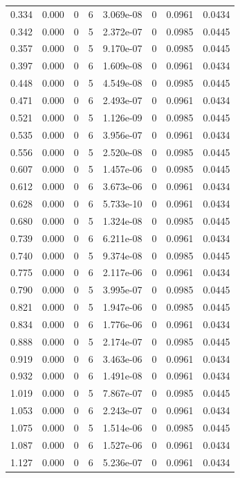 \documentclass[preview]{standalone}
\begin{document}
{{\begin{tabular}{L{1.2cm}C{1.2cm} C{0.3cm}C{0.5cm} C{1.4cm}C{1.4cm} C{1.4cm}C{1.4cm}}
  0.334  &  0.000  & 0     &  6 &  3.069e-08  & 0  & 0.0961 &  0.0434   \\ 
  0.342  &  0.000  & 0     &  5 &  2.372e-07  & 0  & 0.0985 &  0.0445   \\ 
  0.357  &  0.000  & 0     &  5 &  9.170e-07  & 0  & 0.0985 &  0.0445   \\ 
  0.397  &  0.000  & 0     &  6 &  1.609e-08  & 0  & 0.0961 &  0.0434   \\ 
  0.448  &  0.000  & 0     &  5 &  4.549e-08  & 0  & 0.0985 &  0.0445   \\ 
  0.471  &  0.000  & 0     &  6 &  2.493e-07  & 0  & 0.0961 &  0.0434   \\ 
  0.521  &  0.000  & 0     &  5 &  1.126e-09  & 0  & 0.0985 &  0.0445   \\ 
  0.535  &  0.000  & 0     &  6 &  3.956e-07  & 0  & 0.0961 &  0.0434   \\ 
  0.556  &  0.000  & 0     &  5 &  2.520e-08  & 0  & 0.0985 &  0.0445   \\ 
  0.607  &  0.000  & 0     &  5 &  1.457e-06  & 0  & 0.0985 &  0.0445   \\ 
  0.612  &  0.000  & 0     &  6 &  3.673e-06  & 0  & 0.0961 &  0.0434   \\ 
  0.628  &  0.000  & 0     &  6 &  5.733e-10  & 0  & 0.0961 &  0.0434   \\ 
  0.680  &  0.000  & 0     &  5 &  1.324e-08  & 0  & 0.0985 &  0.0445   \\ 
  0.739  &  0.000  & 0     &  6 &  6.211e-08  & 0  & 0.0961 &  0.0434   \\ 
  0.740  &  0.000  & 0     &  5 &  9.374e-08  & 0  & 0.0985 &  0.0445   \\ 
  0.775  &  0.000  & 0     &  6 &  2.117e-06  & 0  & 0.0961 &  0.0434   \\ 
  0.790  &  0.000  & 0     &  5 &  3.995e-07  & 0  & 0.0985 &  0.0445   \\ 
  0.821  &  0.000  & 0     &  5 &  1.947e-06  & 0  & 0.0985 &  0.0445   \\ 
  0.834  &  0.000  & 0     &  6 &  1.776e-06  & 0  & 0.0961 &  0.0434   \\ 
  0.888  &  0.000  & 0     &  5 &  2.174e-07  & 0  & 0.0985 &  0.0445   \\ 
  0.919  &  0.000  & 0     &  6 &  3.463e-06  & 0  & 0.0961 &  0.0434   \\ 
  0.932  &  0.000  & 0     &  6 &  1.491e-08  & 0  & 0.0961 &  0.0434   \\ 
  1.019  &  0.000  & 0     &  5 &  7.867e-07  & 0  & 0.0985 &  0.0445   \\ 
  1.053  &  0.000  & 0     &  6 &  2.243e-07  & 0  & 0.0961 &  0.0434   \\ 
  1.075  &  0.000  & 0     &  5 &  1.514e-06  & 0  & 0.0985 &  0.0445   \\ 
  1.087  &  0.000  & 0     &  6 &  1.527e-06  & 0  & 0.0961 &  0.0434   \\ 
  1.127  &  0.000  & 0     &  6 &  5.236e-07  & 0  & 0.0961 &  0.0434   \\ 
\hline 
\end{tabular} 

}}
\end{document}
